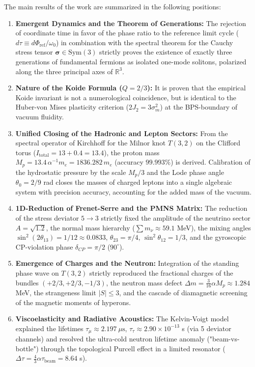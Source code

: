 \documentclass[12pt,a4paper]{article}
\begin{document}
		The main results of the work are summarized in the following positions:
		\begin{enumerate}
			\item \textbf{Emergent Dynamics and the Theorem of Generations:} The rejection of coordinate time in favor of the phase ratio to the reference limit cycle ($d\tau \equiv d\Phi_{\text{ref}}/\omega_0$) in combination with the spectral theorem for the Cauchy stress tensor $\boldsymbol{\sigma} \in \mathrm{Sym}(3)$ strictly proves the existence of exactly three generations of fundamental fermions as isolated one-mode solitons, polarized along the three principal axes of $\mathbb{R}^3$.
			\item \textbf{Nature of the Koide Formula ($Q = 2/3$):} It is proven that the empirical Koide invariant is not a numerological coincidence, but is identical to the Huber-von Mises plasticity criterion ($2J_2 = 3\sigma_m^2$) at the BPS-boundary of vacuum fluidity.
			\item \textbf{Unified Closing of the Hadronic and Lepton Sectors:} From the spectral operator of Kirchhoff for the Milnor knot $T(3,2)$ on the Clifford torus ($I_{\text{total}} = 13 + 0.4 = 13.4$), the proton mass $M_p = 13.4 \, \alpha^{-1} m_e = 1836.282 \, m_e$ (accuracy $99.993\%$) is derived. Calibration of the hydrostatic pressure by the scale $M_p/3$ and the Lode phase angle $\theta_0 = 2/9$ rad closes the masses of charged leptons into a single algebraic system with precision accuracy, accounting for the added mass of the vacuum.
			\item \textbf{1D-Reduction of Frenet-Serre and the PMNS Matrix:} The reduction of the stress deviator $5 \to 3$ strictly fixed the amplitude of the neutrino sector $A = \sqrt{1.2}$, the normal mass hierarchy ($\sum m_\nu \approx 59.1$ MeV), the mixing angles $\sin^2(2\theta_{13}) = 1/12 \approx 0.0833$, $\theta_{23} = \pi/4$, $\sin^2\theta_{12} = 1/3$, and the gyroscopic CP-violation phase $\delta_{CP} = \pi/2$ ($90^\circ$).
			\item \textbf{Emergence of Charges and the Neutron:} Integration of the standing phase wave on $T(3,2)$ strictly reproduced the fractional charges of the bundles $(+2/3, +2/3, -1/3)$, the neutron mass defect $\Delta m = \frac{3}{16}\alpha M_p \approx 1.284$ MeV, the strangeness limit $|S| \le 3$, and the cascade of diamagnetic screening of the magnetic moments of hyperons.
			\item \textbf{Viscoelasticity and Radiative Acoustics:} The Kelvin-Voigt model explained the lifetimes $\tau_\mu \approx 2.197 \ \mu\text{s}$, $\tau_\tau \approx 2.90 \times 10^{-13}$ s (via 5 deviator channels) and resolved the ultra-cold neutron lifetime anomaly ("beam-vs-bottle") through the topological Purcell effect in a limited resonator ($\Delta\tau = \frac{4}{3}\alpha\tau_{\text{beam}} = 8.64$ s).

\end{enumerate}
\end{document}
